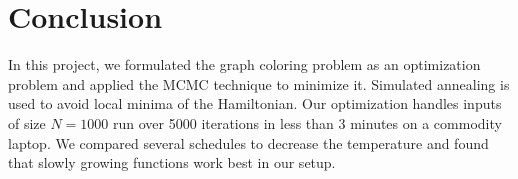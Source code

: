 \documentclass{article}
\begin{document}
  \section*{Conclusion}
  In this project, we formulated the graph coloring problem as an optimization problem and applied the MCMC technique to minimize it. Simulated annealing is used to avoid local minima of the Hamiltonian. Our optimization handles inputs of size $N=1000$ run over 5000 iterations in less than 3 minutes on a commodity laptop. We compared several schedules to decrease the temperature and found that slowly growing functions work best in our setup.
  
\end{document}
